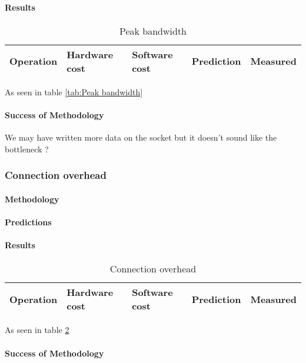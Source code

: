 \paragraph{Results}
\begin{table}[h]
\begin{center}
\begin{tabular}{| l | l | l | l | l |}
\hline
Operation & Hardware cost & Software cost & Prediction & Measured \\
\hline
\end{tabular}
\end{center}
\caption{Peak bandwidth\label{tab:peak-bandwidth}}
\end{table}

As seen in table \ref{tab:Peak bandwidth}
\paragraph{Success of Methodology}
We may have written more data on the socket but it doesn't sound like the
bottleneck ?




\subsubsection{Connection overhead}
\paragraph{Methodology}
\paragraph{Predictions}
\paragraph{Results}
\begin{table} [h]
\begin{center}
\begin{tabular}{| l | l | l | l | l |}
\hline
Operation & Hardware cost & Software cost & Prediction & Measured \\
\hline
\end{tabular}
\end{center}
\caption{Connection overhead\label{tab:connection-overhead}}
\end{table}

As seen in table \ref{tab:connection-overhead}

\paragraph{Success of Methodology}
